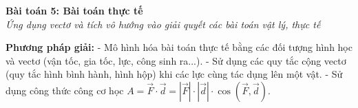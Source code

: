\documentclass[12pt,a4paper]{article}
\newenvironment{lesson}[2]{
	\vspace{1em}\noindent\textbf{\Large #1}\\
	\textit{#2}\vspace{0.5em}
}{}
\begin{document}

\begin{lesson}{Bài toán 5: Bài toán thực tế}{Ứng dụng vectơ và tích vô hướng vào giải quyết các bài toán vật lý, thực tế}

\textbf{Phương pháp giải:}
- Mô hình hóa bài toán thực tế bằng các đối tượng hình học và vectơ (vận tốc, gia tốc, lực, công sinh ra...).
- Sử dụng các quy tắc cộng vectơ (quy tắc hình bình hành, hình hộp) khi các lực cùng tác dụng lên một vật.
- Sử dụng công thức công cơ học $A = \vec{F} \cdot \vec{d} = |\vec{F}| \cdot |\vec{d}| \cdot \cos(\vec{F}, \vec{d})$.

\end{lesson}
\end{document}
